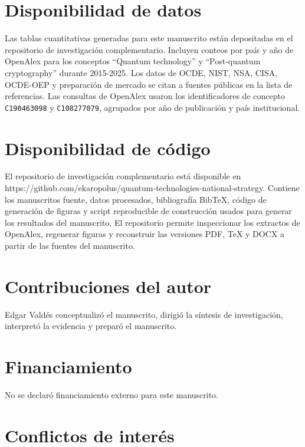 \documentclass[
  11pt,
  letterpaper,
]{article}
\begin{document}
\section{Disponibilidad de datos}\label{disponibilidad-de-datos}

Las tablas cuantitativas generadas para este manuscrito están
depositadas en el repositorio de investigación complementario. Incluyen
conteos por país y año de OpenAlex para los conceptos ``Quantum
technology'' y ``Post-quantum cryptography'' durante 2015-2025. Los
datos de OCDE, NIST, NSA, CISA, OCDE-OEP y preparación de mercado se
citan a fuentes públicas en la lista de referencias. Las consultas de
OpenAlex usaron los identificadores de concepto \texttt{C190463098} y
\texttt{C108277079}, agrupados por año de publicación y país
institucional.

\section{Disponibilidad de código}\label{disponibilidad-de-cuxf3digo}

El repositorio de investigación complementario está disponible en
https://github.com/ekaropolus/quantum-technologies-national-strategy.
Contiene los manuscritos fuente, datos procesados, bibliografía BibTeX,
código de generación de figuras y script reproducible de construcción
usados para generar los resultados del manuscrito. El repositorio
permite inspeccionar los extractos de OpenAlex, regenerar figuras y
reconstruir las versiones PDF, TeX y DOCX a partir de las fuentes del
manuscrito.

\section{Contribuciones del autor}\label{contribuciones-del-autor}

Edgar Valdés conceptualizó el manuscrito, dirigió la síntesis de
investigación, interpretó la evidencia y preparó el manuscrito.

\section{Financiamiento}\label{financiamiento}

No se declaró financiamiento externo para este manuscrito.

\section{Conflictos de interés}\label{conflictos-de-interuxe9s}
\end{document}
